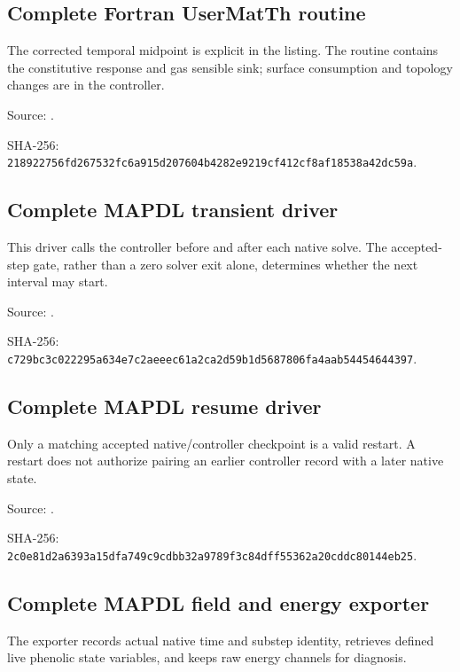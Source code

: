 \documentclass[oneside,openany]{amsdtx}
\begin{document}
\clearpage\subsection{Complete Fortran UserMatTh routine}
The corrected temporal midpoint is explicit in the listing. The routine contains the constitutive response and gas sensible sink; surface consumption and topology changes are in the controller.

{\footnotesize\noindent Source: .\par\noindent SHA-256: \texttt{218922756fd267532fc6a915d207604b4282e9219cf412cf8af18538a42dc59a}.\par}


\clearpage\subsection{Complete MAPDL transient driver}
This driver calls the controller before and after each native solve. The accepted-step gate, rather than a zero solver exit alone, determines whether the next interval may start.

{\footnotesize\noindent Source: .\par\noindent SHA-256: \texttt{c729bc3c022295a634e7c2aeeec61a2ca2d59b1d5687806fa4aab54454644397}.\par}


\clearpage\subsection{Complete MAPDL resume driver}
Only a matching accepted native/controller checkpoint is a valid restart. A restart does not authorize pairing an earlier controller record with a later native state.

{\footnotesize\noindent Source: .\par\noindent SHA-256: \texttt{2c0e81d2a6393a15dfa749c9cdbb32a9789f3c84dff55362a20cddc80144eb25}.\par}


\clearpage\subsection{Complete MAPDL field and energy exporter}
The exporter records actual native time and substep identity, retrieves defined live phenolic state variables, and keeps raw energy channels for diagnosis.
\end{document}
